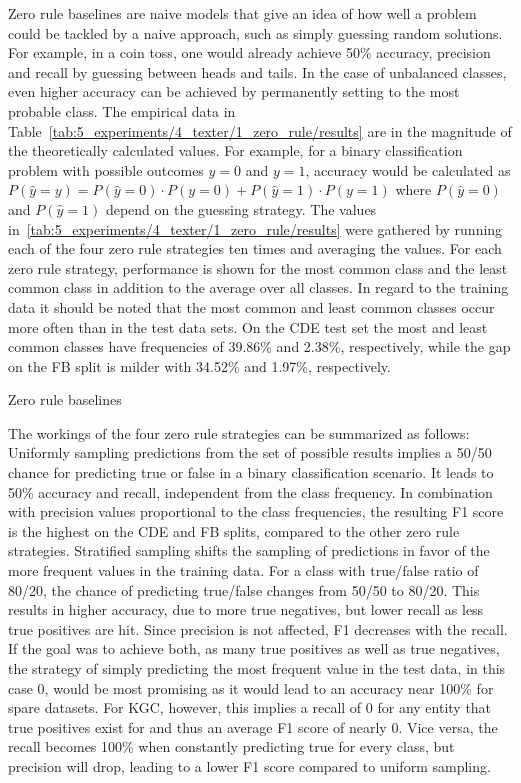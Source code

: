 Zero rule baselines are naive models that give an idea of how well a problem could be tackled by a naive approach, such as simply guessing random solutions. For example, in a coin toss, one would already achieve 50\% accuracy, precision and recall by guessing between heads and tails. In the case of unbalanced classes, even higher accuracy can be achieved by permanently setting to the most probable class. The empirical data in Table~\ref{tab:5_experiments/4_texter/1_zero_rule/results} are in the magnitude of the theoretically calculated values. For example, for a binary classification problem with possible outcomes $y = 0$ and $y = 1$, accuracy would be calculated as $P(\hat{y} = y) = P(\hat{y} = 0) \cdot P(y = 0) + P(\hat{y} = 1) \cdot P(y = 1)$ where $P(\hat{y} = 0)$ and $P(\hat{y} = 1)$ depend on the guessing strategy. The values in~\ref{tab:5_experiments/4_texter/1_zero_rule/results} were gathered by running each of the four zero rule strategies ten times and averaging the values. For each zero rule strategy, performance is shown for the most common class and the least common class in addition to the average over all classes. In regard to the training data it should be noted that the most common and least common classes occur more often than in the test data sets. On the CDE test set the most and least common classes have frequencies of 39.86\% and 2.38\%, respectively, while the gap on the FB split is milder with 34.52\% and 1.97\%, respectively.

\begin{table}[h]
    \makebox[\textwidth][c]{
        
    }
    \caption{Zero rule baselines}
    \label{tab:5_experiments/4_texter/1_zero_rule/results}
\end{table}

The workings of the four zero rule strategies can be summarized as follows: Uniformly sampling predictions from the set of possible results implies a 50/50 chance for predicting true or false in a binary classification scenario. It leads to 50\% accuracy and recall, independent from the class frequency. In combination with precision values proportional to the class frequencies, the resulting F1 score is the highest on the CDE and FB splits, compared to the other zero rule strategies. Stratified sampling shifts the sampling of predictions in favor of the more frequent values in the training data. For a class with true/false ratio of 80/20, the chance of predicting true/false changes from 50/50 to 80/20. This results in higher accuracy, due to more true negatives, but lower recall as less true positives are hit. Since precision is not affected, F1 decreases with the recall. If the goal was to achieve both, as many true positives as well as true negatives, the strategy of simply predicting the most frequent value in the test data, in this case 0, would be most promising as it would lead to an accuracy near 100\% for spare datasets. For KGC, however, this implies a recall of 0 for any entity that true positives exist for and thus an average F1 score of nearly 0. Vice versa, the recall becomes 100\% when constantly predicting true for every class, but precision will drop, leading to a lower F1 score compared to uniform sampling.


